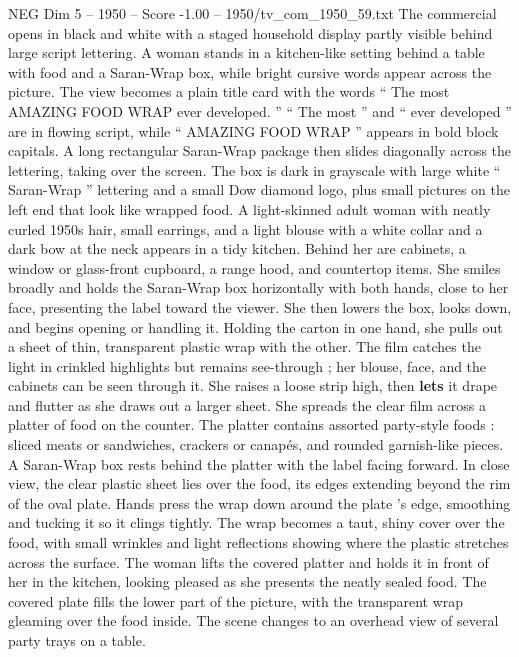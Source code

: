\begin{textsample}{NEG Dim 5 – 1950 – Score -1.00 – 1950/tv\_com\_1950\_59.txt}  \label{ex:f5_neg_029}
The commercial opens in black and white with a staged household display partly visible behind large script lettering.
A woman stands in a kitchen-like setting behind a table with food and a Saran-Wrap box, while bright cursive words appear across the picture.
The view becomes a plain title card with the words “ The most AMAZING FOOD WRAP ever developed. ” “ The most ” and “ ever developed ” are in flowing script, while “ AMAZING FOOD WRAP ” appears in bold block capitals.
A long rectangular Saran-Wrap package then slides diagonally across the lettering, taking over the screen.
The box is dark in grayscale with large white “ Saran-Wrap ” lettering and a small Dow diamond logo, plus small pictures on the left end that look like wrapped food.
A light-skinned adult woman with neatly curled 1950s hair, small earrings, and a light blouse with a white collar and a dark bow at the neck appears in a tidy kitchen.
Behind her are cabinets, a window or glass-front cupboard, a range hood, and countertop items.
She smiles broadly and holds the Saran-Wrap box horizontally with both hands, close to her face, presenting the label toward the viewer.
She then lowers the box, looks down, and begins opening or handling it.
Holding the carton in one hand, she pulls out a sheet of thin, transparent plastic wrap with the other.
The film catches the light in crinkled highlights but remains see-through ; her blouse, face, and the cabinets can be seen through it.
She raises a loose strip high, then \textbf{lets} it drape and flutter as she draws out a larger sheet.
She spreads the clear film across a platter of food on the counter.
The platter contains assorted party-style foods : sliced meats or sandwiches, crackers or canapés, and rounded garnish-like pieces.
A Saran-Wrap box rests behind the platter with the label facing forward.
In close view, the clear plastic sheet lies over the food, its edges extending beyond the rim of the oval plate.
Hands press the wrap down around the plate ’s edge, smoothing and tucking it so it clings tightly.
The wrap becomes a taut, shiny cover over the food, with small wrinkles and light reflections showing where the plastic stretches across the surface.
The woman lifts the covered platter and holds it in front of her in the kitchen, looking pleased as she presents the neatly sealed food.
The covered plate fills the lower part of the picture, with the transparent wrap gleaming over the food inside.
The scene changes to an overhead view of several party trays on a table.

\end{textsample}
